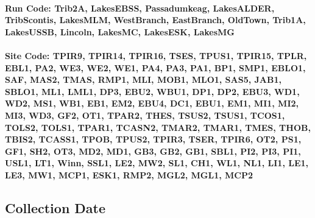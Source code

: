 \documentclass[
  letterpaper,
  DIV=11,
  numbers=noendperiod]{scrartcl}
\let\oldparagraph\paragraph
\renewcommand{\paragraph}[1]{\oldparagraph{#1}\mbox{}}
\begin{document}
\hypertarget{run-code-trib2a-lakesebss-passadumkeag-lakesalder-tribscontis-lakesmlm-westbranch-eastbranch-oldtown-trib1a-lakesussb-lincoln-lakesmc-lakesesk-lakesmg}{%
\paragraph{Run Code: Trib2A, LakesEBSS, Passadumkeag, LakesALDER,
TribScontis, LakesMLM, WestBranch, EastBranch, OldTown, Trib1A,
LakesUSSB, Lincoln, LakesMC, LakesESK,
LakesMG}\label{run-code-trib2a-lakesebss-passadumkeag-lakesalder-tribscontis-lakesmlm-westbranch-eastbranch-oldtown-trib1a-lakesussb-lincoln-lakesmc-lakesesk-lakesmg}}

\hypertarget{site-code-tpir9-tpir14-tpir16-tses-tpus1-tpir15-tplr-ebl1-pa2-we3-we2-we1-pa4-pa3-pa1-bp1-smp1-eblo1-saf-mas2-tmas-rmp1-mli-mob1-mlo1-sas5-jab1-sblo1-ml1-lml1-dp3-ebu2-wbu1-dp1-dp2-ebu3-wd1-wd2-ms1-wb1-eb1-em2-ebu4-dc1-ebu1-em1-mi1-mi2-mi3-wd3-gf2-ot1-tpar2-thes-tsus2-tsus1-tcos1-tols2-tols1-tpar1-tcasn2-tmar2-tmar1-tmes-thob-tbis2-tcass1-tpob-tpus2-tpir3-tser-tpir6-ot2-ps1-gf1-sh2-ot3-md2-md1-gb3-gb2-gb1-sbl1-pi2-pi3-pi1-usl1-lt1-winn-ssl1-le2-mw2-sl1-ch1-wl1-nl1-li1-le1-le3-mw1-mcp1-esk1-rmp2-mgl2-mgl1-mcp2}{%
\paragraph{Site Code: TPIR9, TPIR14, TPIR16, TSES, TPUS1, TPIR15, TPLR,
EBL1, PA2, WE3, WE2, WE1, PA4, PA3, PA1, BP1, SMP1, EBLO1, SAF, MAS2,
TMAS, RMP1, MLI, MOB1, MLO1, SAS5, JAB1, SBLO1, ML1, LML1, DP3, EBU2,
WBU1, DP1, DP2, EBU3, WD1, WD2, MS1, WB1, EB1, EM2, EBU4, DC1, EBU1,
EM1, MI1, MI2, MI3, WD3, GF2, OT1, TPAR2, THES, TSUS2, TSUS1, TCOS1,
TOLS2, TOLS1, TPAR1, TCASN2, TMAR2, TMAR1, TMES, THOB, TBIS2, TCASS1,
TPOB, TPUS2, TPIR3, TSER, TPIR6, OT2, PS1, GF1, SH2, OT3, MD2, MD1, GB3,
GB2, GB1, SBL1, PI2, PI3, PI1, USL1, LT1, Winn, SSL1, LE2, MW2, SL1,
CH1, WL1, NL1, LI1, LE1, LE3, MW1, MCP1, ESK1, RMP2, MGL2, MGL1,
MCP2}\label{site-code-tpir9-tpir14-tpir16-tses-tpus1-tpir15-tplr-ebl1-pa2-we3-we2-we1-pa4-pa3-pa1-bp1-smp1-eblo1-saf-mas2-tmas-rmp1-mli-mob1-mlo1-sas5-jab1-sblo1-ml1-lml1-dp3-ebu2-wbu1-dp1-dp2-ebu3-wd1-wd2-ms1-wb1-eb1-em2-ebu4-dc1-ebu1-em1-mi1-mi2-mi3-wd3-gf2-ot1-tpar2-thes-tsus2-tsus1-tcos1-tols2-tols1-tpar1-tcasn2-tmar2-tmar1-tmes-thob-tbis2-tcass1-tpob-tpus2-tpir3-tser-tpir6-ot2-ps1-gf1-sh2-ot3-md2-md1-gb3-gb2-gb1-sbl1-pi2-pi3-pi1-usl1-lt1-winn-ssl1-le2-mw2-sl1-ch1-wl1-nl1-li1-le1-le3-mw1-mcp1-esk1-rmp2-mgl2-mgl1-mcp2}}

\hypertarget{collection-date}{%
\subsection{Collection Date}\label{collection-date}}
\end{document}
